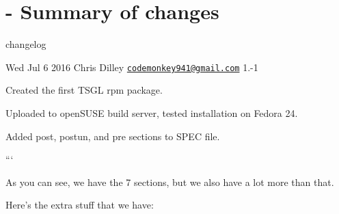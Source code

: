 \section*{-\/ Summary of changes}

changelog
\begin{DoxyItemize}
\item Wed Jul 6 2016 Chris Dilley \href{mailto:codemonkey941@gmail.com}{\tt codemonkey941@gmail.\-com} 1.-\/1
\item Created the first T\-S\-G\-L rpm package.
\item Uploaded to open\-S\-U\-S\-E build server, tested installation on Fedora 24.
\item Added post, postun, and pre sections to S\-P\-E\-C file.
\end{DoxyItemize}

```

As you can see, we have the 7 sections, but we also have a lot more than that.

Here's the extra stuff that we have\-:


